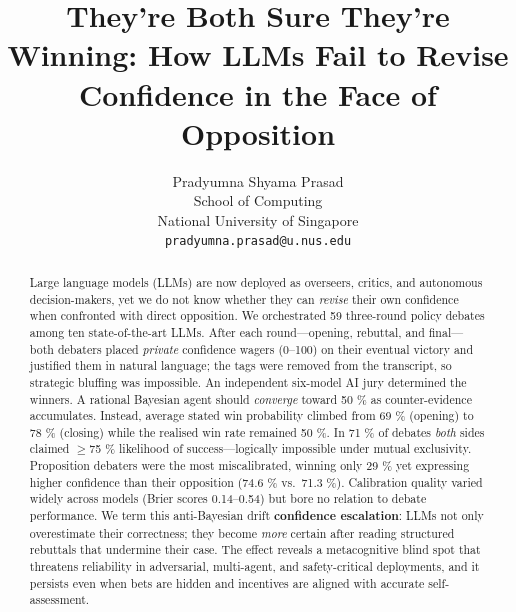 \documentclass{article}
\title{They’re Both Sure They’re Winning: How LLMs Fail to Revise Confidence in the Face of Opposition}
\author{%
Pradyumna Shyama Prasad \\ %
  School of Computing \\ %
  National University of Singapore \\ %
  \texttt{pradyumna.prasad@u.nus.edu} \\ %
}
\begin{document}
\maketitle


    \begin{abstract}
        \begin{abstract}
            Large language models (LLMs) are now deployed as overseers, critics, and autonomous decision-makers, yet we do not know whether they can \emph{revise} their own confidence when confronted with direct opposition. We orchestrated 59 three-round policy debates among ten state-of-the-art LLMs. After each round—opening, rebuttal, and final—both debaters placed \textit{private} confidence wagers (0–100) on their eventual victory and justified them in natural language; the tags were removed from the transcript, so strategic bluffing was impossible. An independent six-model AI jury determined the winners. A rational Bayesian agent should \textit{converge} toward 50 \% as counter-evidence accumulates. Instead, average stated win probability climbed from 69 \% (opening) to 78 \% (closing) while the realised win rate remained 50 \%. In 71 \% of debates \emph{both} sides claimed $\ge$75 \% likelihood of success—logically impossible under mutual exclusivity. Proposition debaters were the most miscalibrated, winning only 29 \% yet expressing higher confidence than their opposition (74.6 \% vs.\ 71.3 \%). Calibration quality varied widely across models (Brier scores 0.14–0.54) but bore no relation to debate performance. We term this anti-Bayesian drift \textbf{confidence escalation}: LLMs not only overestimate their correctness; they become \emph{more} certain after reading structured rebuttals that undermine their case. The effect reveals a metacognitive blind spot that threatens reliability in adversarial, multi-agent, and safety-critical deployments, and it persists even when bets are hidden and incentives are aligned with accurate self-assessment.
            \end{abstract}

    \end{abstract}

\end{document}

